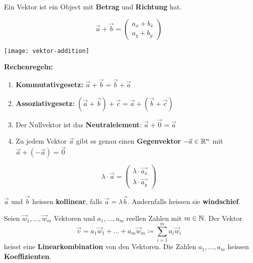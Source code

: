 

Ein Vektor ist ein Object mit \textbf{Betrag} und \textbf{Richtung} hat.



\begin{multicols}{2}
    \[\vec{a} + \vec{b} = \left(
    \begin{array}{c}
        a_x + b_x \\
        a_y + b_y
    \end{array}
    \right)\]
    \begin{center}
        \texttt{[image: vektor-addition]}
    \end{center}
\end{multicols}

\textbf{Rechenregeln:}
\begin{enumerate}
    \item \textbf{Kommutativgesetz:} $\vec{a} + \vec{b} = \vec{b} + \vec{a}$
    \item \textbf{Assoziativgesetz:} $(\vec{a} + \vec{b}) + \vec{c} = \vec{a} + (\vec{b} + \vec{c})$
    \item Der Nullvektor ist das \textbf{Neutralelement}: $\vec{a} + \vec{0} = \vec{a}$
    \item Zu jedem Vektor $\vec{a}$ gibt es genau einen \textbf{Gegenvektor} $-\vec{a} \in \mathbb{R}^n$ mit $\vec{a} + (-\vec{a}) = \vec{0}$
\end{enumerate}


\vspace{0.5em}

\begin{multicols}{2}
    \[\lambda \cdot \vec{a} = \left(
    \begin{array}{c}
        \lambda \cdot \vec{a_x} \\
        \lambda \cdot \vec{a_y}
    \end{array}
    \right)\]

    $\vec{a}$ und $\vec{b}$ heissen \textbf{kollinear}, falls $\vec{a} = \lambda \vec{b}$.
    Andernfalls heissen sie \textbf{windschief}.
\end{multicols}

Seien $\vec{w}_1, \dots, \vec{w}_m$ Vektoren und $a_1, \dots, a_m$ reellen Zahlen mit $m \in \mathbb{N}$.
Der Vektor \[\vec{v} = a_1 \vec{w}_1 + \dots + a_m \vec{w}_m \coloneqq \sum_{i=1}^{m} a_i \vec{w}_i\] heisst eine \textbf{Linearkombination} von den Vektoren.
Die Zahlen $a_1, \dots, a_m$ heissen \textbf{Koeffizienten}.

